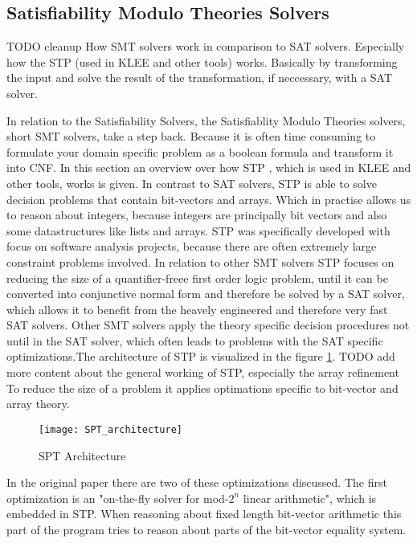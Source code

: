 \subsection{Satisfiability Modulo Theories Solvers}
TODO cleanup
How SMT solvers work in comparison to SAT solvers.
Especially how the STP \cite{Ganesh:2007:DPB:1770351.1770421} (used in KLEE and other tools) works.
Basically by transforming the input and solve the result of the transformation, if neccessary, with a SAT solver.

In relation to the Satisfiability Solvers, the Satisfiablity Modulo Theories solvers, short SMT solvers, take a step back. Because it is often time consuming to formulate your domain specific problem as a boolean formula and transform it into CNF. In this section an overview over how STP \cite{Ganesh:2007:DPB:1770351.1770421}, which is used in KLEE and other tools, works is given.
In contrast to SAT solvers, STP is able to solve decision problems that contain bit-vectors and arrays. Which in practise allows us to reason about integers, because integers are principally bit vectors and also some datastructures like lists and arrays. STP was specifically developed with focus on software analysis projects, because there are often extremely large constraint problems involved. In relation to other SMT solvers STP focuses on reducing the size of a quantifier-freee first order logic problem, until it can be converted into conjunctive normal form and therefore be solved by a SAT solver, which allows it to benefit from the heavely engineered and therefore very fast SAT solvers. Other SMT solvers apply the theory specific decision procedures not until in the SAT solver, which often leads to problems with the SAT specific optimizations.The architecture of STP is visualized in the figure \ref{fig:spt_architecture}.
TODO add more content about the general working of STP, especially the array refinement
To reduce the size of a problem it applies optimations specific to bit-vector and array theory.
\begin{figure}
\texttt{[image: SPT\_architecture]}
\centering
\caption{SPT Architecture}
\label{fig:spt_architecture}
\end{figure}
In the original paper\cite{Ganesh:2007:DPB:1770351.1770421} there are two of these optimizations discussed. The first optimization is an "on-the-fly solver for mod-$2^n$ linear arithmetic", which is embedded in STP. 
When reasoning about fixed length bit-vector arithmetic this part of the program tries to reason about parts of the bit-vector equality system.
